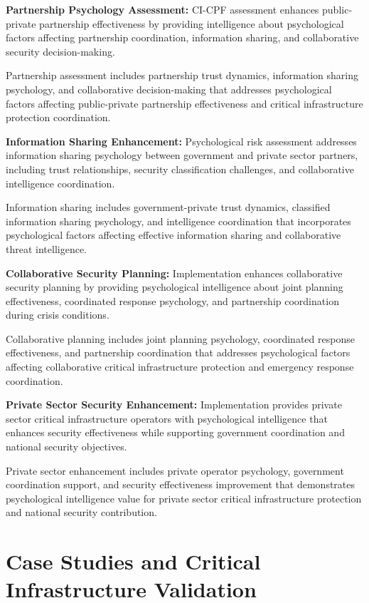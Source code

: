\documentclass[10pt, twocolumn]{article}
\begin{document}
\textbf{Partnership Psychology Assessment:} CI-CPF assessment enhances public-private partnership effectiveness by providing intelligence about psychological factors affecting partnership coordination, information sharing, and collaborative security decision-making.

Partnership assessment includes partnership trust dynamics, information sharing psychology, and collaborative decision-making that addresses psychological factors affecting public-private partnership effectiveness and critical infrastructure protection coordination.

\textbf{Information Sharing Enhancement:} Psychological risk assessment addresses information sharing psychology between government and private sector partners, including trust relationships, security classification challenges, and collaborative intelligence coordination.

Information sharing includes government-private trust dynamics, classified information sharing psychology, and intelligence coordination that incorporates psychological factors affecting effective information sharing and collaborative threat intelligence.

\textbf{Collaborative Security Planning:} Implementation enhances collaborative security planning by providing psychological intelligence about joint planning effectiveness, coordinated response psychology, and partnership coordination during crisis conditions.

Collaborative planning includes joint planning psychology, coordinated response effectiveness, and partnership coordination that addresses psychological factors affecting collaborative critical infrastructure protection and emergency response coordination.

\textbf{Private Sector Security Enhancement:} Implementation provides private sector critical infrastructure operators with psychological intelligence that enhances security effectiveness while supporting government coordination and national security objectives.

Private sector enhancement includes private operator psychology, government coordination support, and security effectiveness improvement that demonstrates psychological intelligence value for private sector critical infrastructure protection and national security contribution.

\section{Case Studies and Critical Infrastructure Validation}
\end{document}
